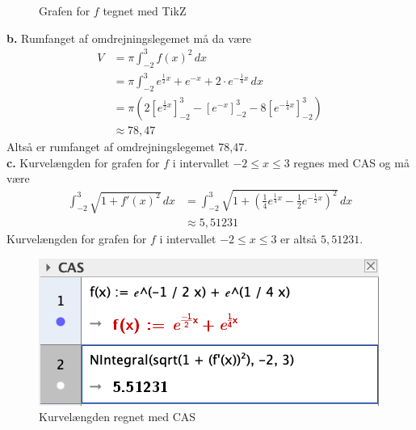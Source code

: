 \documentclass{article}
\begin{document}
\begin{figure}[H]
\begin{center}
\end{center}
\caption{Grafen for $f$ tegnet med TikZ}
\label{fig:graf}
\end{figure}
\textbf{b.}
Rumfanget af omdrejningslegemet må da være 
\begin{equation*}
\begin{split}
  V&=\pi \int_{-2}^{3} f(x)^2 \,dx \\ 
  &=\pi \int_{-2}^{3}  e^{\frac{1}{2}x}+e^{-x} +2 \cdot e^{-\frac{1}{4}x} \,dx \\
  &= \pi \left(2\left[ e^{\frac{1}{2}x} \right]_{-2}^3 -\left[e^{-x} \right]_{-2}^3-8\left[ e^{-\frac{1}{4}x} \right]_{-2}^3\right) \\ 
  &\approx 78,47
\end{split}
\end{equation*}
Altså er rumfanget af omdrejningslegemet 78,47. \\[1ex]
\textbf{c.}
Kurvelængden for grafen for $f$ i intervallet $-2 \leq x \leq 3$ regnes med CAS og må være
\begin{equation*}
\begin{split}
  \int_{-2}^{3} \sqrt{1+f'(x)^2}  \,dx &=\int_{-2}^{3} \sqrt{1+\left(\frac{1}{4}e^{\frac{1}{4}x} -\frac{1}{2} e^{-\frac{1}{2}x} \right)^2 }  \,dx \\
  &\approx 5,51231 
\end{split}
\end{equation*}
Kurvelængden for grafen for $f$ i intervallet $-2 \leq x \leq 3$ er altså $5,51231$. 
\begin{figure}[H]
\begin{center}
  \includegraphics[scale=0.7]{CAS.png}
\end{center}
\caption{Kurvelængden regnet med CAS}
\label{fig:CAS}
\end{figure}
\end{document}
